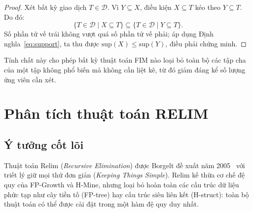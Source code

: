 \documentclass[12pt,a4paper]{report}
\begin{document}
\begin{proof}
Xét bất kỳ giao dịch $T \in \mathcal{D}$. Vì $Y \subseteq X$, điều kiện $X \subseteq T$
kéo theo $Y \subseteq T$. Do đó:
\begin{equation}
    \{T \in \mathcal{D} \mid X \subseteq T\} \subseteq \{T \in \mathcal{D} \mid
    Y \subseteq T\}.
    \label{eq:subset_proof}
\end{equation}
Số phần tử vế trái không vượt quá số phần tử vế phải; áp dụng
Định nghĩa~\eqref{eq:support}, ta thu được
$\mathrm{sup}(X) \leq \mathrm{sup}(Y)$, điều phải chứng minh.
\end{proof}
 
Tính chất này cho phép bất kỳ thuật toán FIM nào loại bỏ toàn bộ các tập cha của
một tập không phổ biến mà không cần liệt kê, từ đó giảm đáng kể số lượng
ứng viên cần xét.
 
\section{Phân tích thuật toán RELIM}
 
 

\subsection{Ý tưởng cốt lõi}
\label{subsec:relim-idea}

Thuật toán Relim (\textit{Recursive Elimination}) được Borgelt đề xuất năm
2005~\cite{borgelt2005} với triết lý giữ mọi thứ đơn giản (\textit{Keeping
Things Simple}). Relim kế thừa cơ chế đệ quy của FP-Growth và
H-Mine, nhưng loại bỏ hoàn toàn các cấu trúc dữ liệu phức tạp như
cây tiền tố (FP-tree) hay cấu trúc siêu liên kết (H-struct): toàn bộ
thuật toán có thể được cài đặt trong một hàm đệ quy duy nhất.
\end{document}
